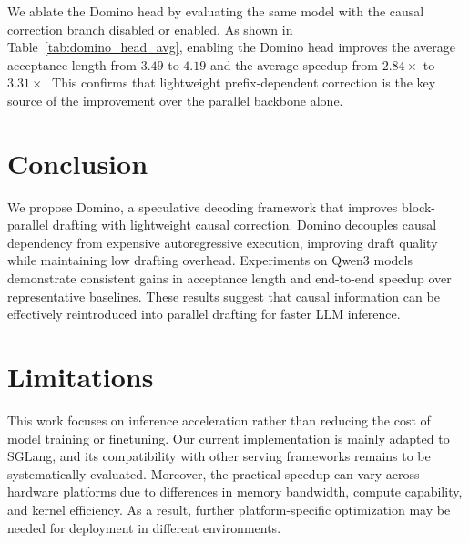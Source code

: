\documentclass{llmxive}
\providecommand{\arraystretch}{0.92}
\begin{document}
We ablate the Domino head by evaluating the same model with the causal correction branch disabled or enabled. As shown in Table~\ref{tab:domino_head_avg}, enabling the Domino head improves the average acceptance length from \(3.49\) to \(4.19\) and the average speedup from \(2.84\times\) to \(3.31\times\). This confirms that lightweight prefix-dependent correction is the key source of the improvement over the parallel backbone alone.

\begin{table}[t]
\centering
\setlength{\tabcolsep}{5pt}
\renewcommand{\arraystretch}{1.05}
\vspace{-2mm}
\caption{
Effect of the Domino head. We report average results here and provide full results in Table~\ref{tab:domino_head_full}.
}
\label{tab:domino_head_avg}
\end{table}

 

\section{Conclusion}
We propose Domino, a speculative decoding framework that improves block-parallel drafting with lightweight causal correction. Domino decouples causal dependency from expensive autoregressive execution, improving draft quality while maintaining low drafting overhead. Experiments on Qwen3 models demonstrate consistent gains in acceptance length and end-to-end speedup over representative baselines. These results suggest that causal information can be effectively reintroduced into parallel drafting for faster LLM inference.

\section{Limitations}
This work focuses on inference acceleration rather than reducing the cost of model training or finetuning.
Our current implementation is mainly adapted to SGLang, and its compatibility with other serving frameworks remains to be systematically evaluated.
Moreover, the practical speedup can vary across hardware platforms due to differences in memory bandwidth, compute capability, and kernel efficiency.
As a result, further platform-specific optimization may be needed for deployment in different environments.
\end{document}
